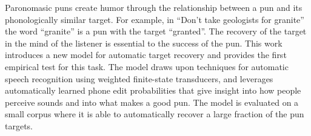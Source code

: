 Paronomasic puns create humor through the relationship between a pun and its phonologically similar target. For example, in ``Don't take geologists for granite'' the word ``granite'' is a pun with the target ``granted''. The recovery of the target in the mind of the listener is essential to the success of the pun. This work introduces a new model for automatic target recovery and provides the first empirical test for this task. The model draws upon techniques for automatic speech recognition using weighted finite-state transducers, and leverages automatically learned phone edit probabilities that give insight into how people perceive sounds and into what makes a good pun.  The model is evaluated on a small corpus where it is able to automatically recover a large fraction of the pun targets.
